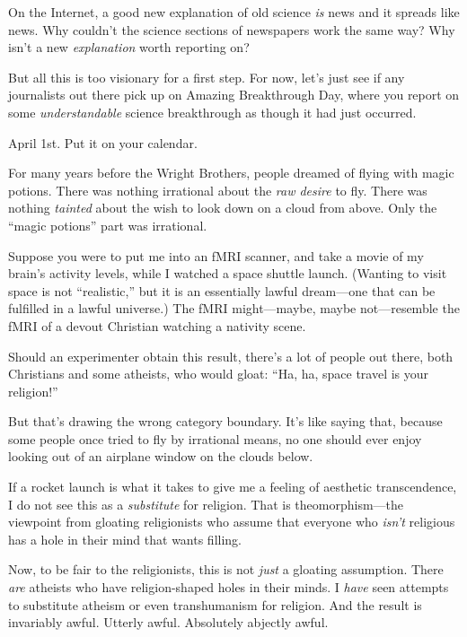 {
 On the Internet, a good new explanation of old science \textit{is}
news and it spreads like news. Why couldn't the science
sections of newspapers work the same way? Why isn't a
new \textit{explanation} worth reporting on?}

{
 But all this is too visionary for a first step. For now,
let's just see if any journalists out there pick up on
Amazing Breakthrough Day, where you report on some
\textit{understandable} science breakthrough as though it had just
occurred.}

{
 April 1st. Put it on your calendar.}

\myendsectiontext


{
 For many years before the Wright Brothers, people dreamed of
flying with magic potions. There was nothing irrational about the
\textit{raw desire} to fly. There was nothing \textit{tainted} about
the wish to look down on a cloud from above. Only the
``magic potions'' part was
irrational.}

{
 Suppose you were to put me into an fMRI scanner, and take a movie
of my brain's activity levels, while I watched a space
shuttle launch. (Wanting to visit space is not
``realistic,'' but it is an
essentially lawful dream---one that can be fulfilled in a lawful
universe.) The fMRI might---maybe, maybe not---resemble the fMRI of a
devout Christian watching a nativity scene.}

{
 Should an experimenter obtain this result, there's
a lot of people out there, both Christians and some atheists, who would
gloat: ``Ha, ha, space travel is your
religion!''}

{
 But that's drawing the wrong category boundary.
It's like saying that, because some people once tried
to fly by irrational means, no one should ever enjoy looking out of an
airplane window on the clouds below.}

{
 If a rocket launch is what it takes to give me a feeling of
aesthetic transcendence, I do not see this as a \textit{substitute} for
religion. That is theomorphism---the viewpoint from gloating
religionists who assume that everyone who
\textit{isn't} religious has a hole in their mind that
wants filling.}

{
 Now, to be fair to the religionists, this is not \textit{just} a
gloating assumption. There \textit{are} atheists who have
religion-shaped holes in their minds. I \textit{have} seen attempts to
substitute atheism or even transhumanism for religion. And the result
is invariably awful. Utterly awful. Absolutely abjectly awful.}

